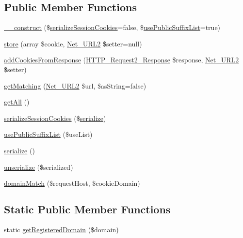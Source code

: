 \subsection*{Public Member Functions}
\begin{DoxyCompactItemize}
\item 
\hyperlink{classHTTP__Request2__CookieJar_a0df8fa6c7a4d383b595fa62a62d280f1}{\+\_\+\+\_\+construct} (\$\hyperlink{classHTTP__Request2__CookieJar_a2a81535d5a9762c3d6ae9229f2349813}{serialize\+Session\+Cookies}=false, \$\hyperlink{classHTTP__Request2__CookieJar_aa5754da6e9d23db800e091bc16fb3bc8}{use\+Public\+Suffix\+List}=true)
\item 
\hyperlink{classHTTP__Request2__CookieJar_a282b74d495d895691cf2dd4e7a7d467e}{store} (array \$cookie, \hyperlink{classNet__URL2}{Net\+\_\+\+U\+R\+L2} \$setter=null)
\item 
\hyperlink{classHTTP__Request2__CookieJar_ac36b125ea28edd3383bfc7122bfe3492}{add\+Cookies\+From\+Response} (\hyperlink{classHTTP__Request2__Response}{H\+T\+T\+P\+\_\+\+Request2\+\_\+\+Response} \$response, \hyperlink{classNet__URL2}{Net\+\_\+\+U\+R\+L2} \$setter)
\item 
\hyperlink{classHTTP__Request2__CookieJar_a1a5ded22296cb2445004e579b8f38eab}{get\+Matching} (\hyperlink{classNet__URL2}{Net\+\_\+\+U\+R\+L2} \$url, \$as\+String=false)
\item 
\hyperlink{classHTTP__Request2__CookieJar_ac38ab1d49f98cb8261b3fe8eeb482125}{get\+All} ()
\item 
\hyperlink{classHTTP__Request2__CookieJar_a2a81535d5a9762c3d6ae9229f2349813}{serialize\+Session\+Cookies} (\$\hyperlink{classHTTP__Request2__CookieJar_ac6fa68d8621d1aef56c0eb8231612839}{serialize})
\item 
\hyperlink{classHTTP__Request2__CookieJar_aa5754da6e9d23db800e091bc16fb3bc8}{use\+Public\+Suffix\+List} (\$use\+List)
\item 
\hyperlink{classHTTP__Request2__CookieJar_ac6fa68d8621d1aef56c0eb8231612839}{serialize} ()
\item 
\hyperlink{classHTTP__Request2__CookieJar_ae63b138701ec28ec7f7c7a2b90f0a3a7}{unserialize} (\$serialized)
\item 
\hyperlink{classHTTP__Request2__CookieJar_ad22bee9ce6d2c111120bf44c3e302401}{domain\+Match} (\$request\+Host, \$cookie\+Domain)
\end{DoxyCompactItemize}
\subsection*{Static Public Member Functions}
\begin{DoxyCompactItemize}
\item 
static \hyperlink{classHTTP__Request2__CookieJar_a66c53f8393c3562e58491105165e77a9}{get\+Registered\+Domain} (\$domain)
\end{DoxyCompactItemize}
